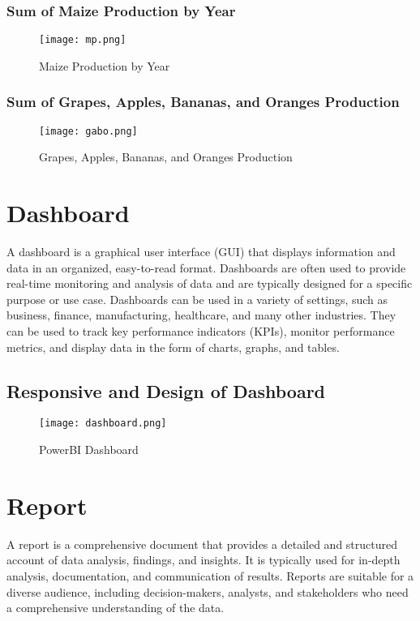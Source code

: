 \documentclass{article}
\begin{document}
\subsubsection{Sum of Maize Production by Year}
\begin{figure}[H]
    \centering
    \texttt{[image: mp.png]}
    \caption{Maize Production by Year}
    \label{fig:mp}
  \end{figure}
\subsubsection{Sum of Grapes, Apples, Bananas, and Oranges Production}
\begin{figure}[H]
    \centering
    \texttt{[image: gabo.png]}
    \caption{Grapes, Apples, Bananas, and Oranges Production}
    \label{fig:gabo}
  \end{figure}

\section{Dashboard}
A dashboard is a graphical user interface (GUI) that displays information and data in an organized, easy-to-read format. Dashboards are often used to provide real-time monitoring and analysis of data and are typically designed for a specific purpose or use case. Dashboards can be used in a variety of settings, such as business, finance, manufacturing, healthcare, and many other industries. They can be used to track key performance indicators (KPIs), monitor performance metrics, and display data in the form of charts, graphs, and tables.
\subsection{Responsive and Design of Dashboard}
\begin{figure}[H]
    \centering
    \texttt{[image: dashboard.png]}
    \caption{PowerBI Dashboard}
    \label{fig:dashboard}
  \end{figure}

\section{Report}
A report is a comprehensive document that provides a detailed and structured account of data analysis, findings, and insights. It is typically used for in-depth analysis, documentation, and communication of results. Reports are suitable for a diverse audience, including decision-makers, analysts, and stakeholders who need a comprehensive understanding of the data. 
\end{document}
